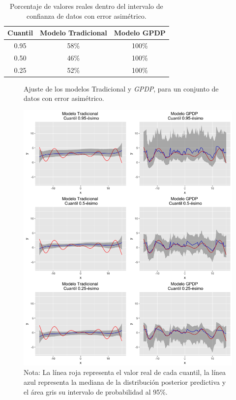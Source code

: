 \begin{table}[H]
\centering
\caption{Porcentaje de valores reales dentro del intervalo de confianza de datos con error asimétrico.} 
\begin{tabular}{ccc}
  \hline
Cuantil & Modelo Tradicional & Modelo GPDP \\ 
  \hline
0.95 & 58\% & 100\% \\ 
  0.50 & 46\% & 100\% \\ 
  0.25 & 52\% & 100\% \\ 
   \hline
\end{tabular}
\label{within_asymmetric}
\end{table}

\begin{figure}[htbp]
	\centering
	\caption{Ajuste de los modelos Tradicional y \textit{GPDP}, para un conjunto de datos con error asim\'etrico.}
	\includegraphics[width=\textwidth]{Figures/Simulation/asymmetric/predictions.png}
	\captionsetup{singlelinecheck=off,font=footnotesize}
    \caption*{Nota: La l\'inea roja representa el valor real de cada cuantil, la l\'inea azul representa la mediana de la distribuci\'on posterior predictiva y el \'area gris su intervalo de probabilidad al 95\%.}
	\label{models_asymmetric}
\end{figure}

